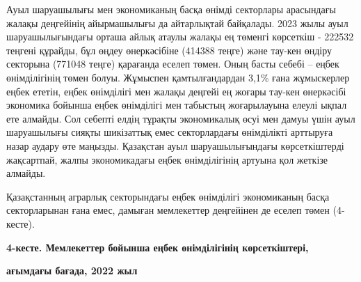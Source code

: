 {{Ауыл шаруашылығы мен экономиканың басқа өнімді секторлары арасындағы
жалақы деңгейінің айырмашылығы да айтарлықтай байқалады. 2023 жылы ауыл
шаруашылығындағы орташа айлық атаулы жалақы ең төменгі көрсеткіш -
222532 теңгені құрайды, бұл өңдеу өнеркәсібіне (414388 теңге) және
тау-кен өндіру секторына (771048 теңге) қарағанда еселеп төмен. Оның
басты себебі -- еңбек өнімділігінің төмен болуы. Жұмыспен
қамтылғандардан 3,1\% ғана жұмыскерлер еңбек ететін, еңбек өнімділігі
мен жалақы деңгейі ең жоғары тау-кен өнеркәсібі экономика бойынша еңбек
өнімділігі мен табыстың жоғарылауына елеулі ықпал ете алмайды. Сол
себепті елдің тұрақты экономикалық өсуі мен дамуы үшін ауыл шаруашылығы
сияқты шикізаттық емес секторлардағы өнімділікті арттыруға назар аудару
өте маңызды. Қазақстан ауыл шаруашылығындағы көрсеткіштерді жақсартпай,
жалпы экономикадағы еңбек өнімділігінің артуына қол жеткізе алмайды.

Қазақстанның аграрлық секторындағы еңбек өнімділігі экономиканың басқа
секторларынан ғана емес, дамыған мемлекеттер деңгейінен де еселеп төмен
(4-кесте).

{\bfseries 4-кесте. Мемлекеттер бойынша еңбек өнімділігінің көрсеткіштері,}

{\bfseries ағымдағы бағада, 2022 жыл}

}}
